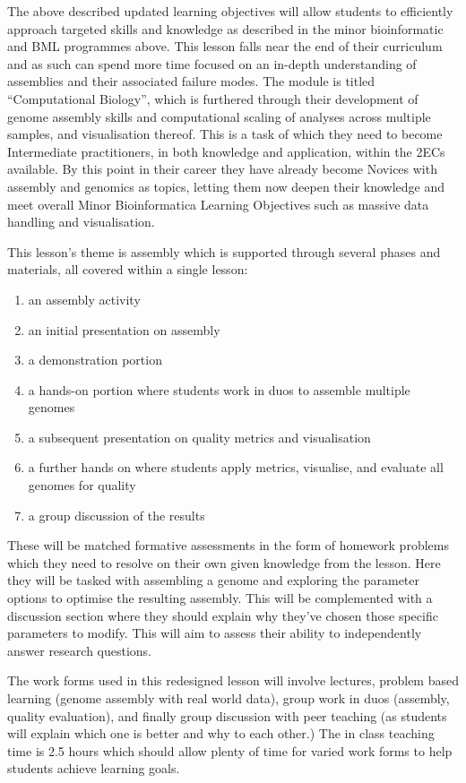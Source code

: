 \documentclass[paper=a4,justified,a4paper]{tufte-handout}
\providecommand{\tightlist}{%
  \setlength{\itemsep}{0pt}\setlength{\parskip}{0pt}}
\begin{document}
The above described updated learning objectives will allow students to
efficiently approach targeted skills and knowledge as described in the
minor bioinformatic and BML programmes above. This lesson falls near the
end of their curriculum and as such can spend more time focused on an
in-depth understanding of assemblies and their associated failure modes.
The module is titled ``Computational Biology'', which is furthered
through their development of genome assembly skills and computational
scaling of analyses across multiple samples, and visualisation thereof.
This is a task of which they need to become Intermediate practitioners,
in both knowledge and application, within the 2ECs available. By this
point in their career they have already become Novices with assembly and
genomics as topics, letting them now deepen their knowledge and meet
overall Minor Bioinformatica Learning Objectives such as massive data
handling and visualisation.

This lesson's theme is assembly which is supported through several
phases and materials, all covered within a single lesson:

\begin{enumerate}
\def\labelenumi{\arabic{enumi}.}
\tightlist
\item
  an assembly activity
\item
  an initial presentation on assembly
\item
  a demonstration portion
\item
  a hands-on portion where students work in duos to assemble multiple
  genomes
\item
  a subsequent presentation on quality metrics and visualisation
\item
  a further hands on where students apply metrics, visualise, and
  evaluate all genomes for quality
\item
  a group discussion of the results
\end{enumerate}

These will be matched formative assessments in the form of homework
problems which they need to resolve on their own given knowledge from
the lesson. Here they will be tasked with assembling a genome and
exploring the parameter options to optimise the resulting assembly. This
will be complemented with a discussion section where they should explain
why they've chosen those specific parameters to modify. This will aim to
assess their ability to independently answer research questions.

The work forms used in this redesigned lesson will involve lectures,
problem based learning (genome assembly with real world data), group
work in duos (assembly, quality evaluation), and finally group
discussion with peer teaching (as students will explain which one is
better and why to each other.) The in class teaching time is 2.5 hours
which should allow plenty of time for varied work forms to help students
achieve learning goals.


\end{document}
